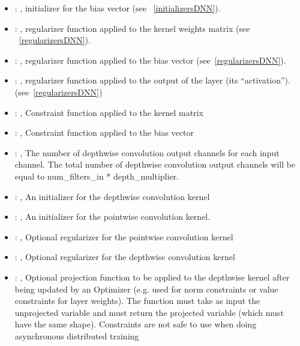 \begin{itemize}
\begin{itemize}
        \item {}: , 
          initializer for the bias vector (see ~\ref{initializersDNN}).

        \item {}: , 
          regularizer function applied to the kernel weights matrix (see ~\ref{regularizersDNN}).

        \item {}: , 
          regularizer function applied to the bias vector (see~\ref{regularizersDNN}).

        \item {}: , 
          regularizer function applied to the output         of the layer (its ``activation'').
          (see~\ref{regularizersDNN})

        \item {}: , 
          Constraint function applied to the kernel matrix

        \item {}: , 
          Constraint function applied to the bias vector

        \item {}: , 
          The number of depthwise convolution output channels for each input channel. The total
          number of         depthwise convolution output channels will be equal to num\_filters\_in *
          depth\_multiplier.

        \item {}: , 
          An initializer for the depthwise convolution kernel

        \item {}: , 
          An initializer for the pointwise convolution kernel.

        \item {}: , 
          Optional regularizer for the pointwise convolution kernel

        \item {}: , 
          Optional regularizer for the depthwise convolution kernel

        \item {}: , 
          Optional projection function to be applied to the depthwise kernel after being updated by
          an Optimizer         (e.g. used for norm constraints or value constraints for layer
          weights). The function must take as input the         unprojected variable and must return
          the projected variable (which must have the same shape).         Constraints are not safe
          to use when doing asynchronous distributed training


\end{itemize}
\end{itemize}
